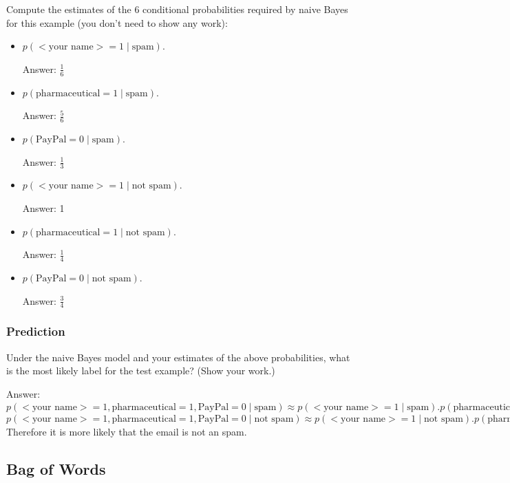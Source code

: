 \documentclass{article}
\def\ans#1{\par\gre{Answer: #1}}
\def\blu#1{{\color{blu}#1}}
\def\gre#1{{\color{gre}#1}}
\def\cond{\; | \;}
\def\items#1{\begin{itemize}#1\end{itemize}}
\begin{document}
\blu{Compute the estimates of the 6 conditional probabilities required by naive Bayes for this example}  (you don't need to show any work):
\items{
\item $p(\text{$<$your name$>$} = 1  \cond \text{spam})$.
	\ans{$\frac{1}{6}$}
\item $p(\text{pharmaceutical} = 1 \cond \text{spam})$.
	\ans{$\frac{5}{6}$}
\item $p(\text{PayPal} = 0  \cond \text{spam})$.
	\ans{$\frac{1}{3}$}
\item $p(\text{$<$your name$>$} = 1  \cond \text{not spam})$.
	\ans{1}
\item $p(\text{pharmaceutical} = 1  \cond \text{not spam})$.
	\ans{$\frac{1}{4}$}
\item $p(\text{PayPal} = 0  \cond \text{not spam})$.
	\ans{$\frac{3}{4}$}
}

\subsubsection{Prediction}


\blu{Under the naive Bayes model and your estimates of the above probabilities, what is the most likely label for the test example? (Show your work.)}

\ans{
    \newline
    $p(\text{$<$your name$>$} = 1, \text{pharmaceutical} = 1, \text{PayPal} = 0  \cond \text{spam}) \approx p(\text{$<$your name$>$} = 1  \cond \text{spam}) . p(\text{pharmaceutical} = 1 \cond \text{spam}) . p(\text{PayPal} = 0  \cond \text{spam}) = \frac{5}{108}$
    \newline
    $p(\text{$<$your name$>$} = 1, \text{pharmaceutical} = 1, \text{PayPal} = 0  \cond \text{not spam}) \approx p(\text{$<$your name$>$} = 1  \cond \text{not spam}) . p(\text{pharmaceutical} = 1 \cond \text{not spam}) . p(\text{PayPal} = 0  \cond \text{not spam}) = \frac{3}{16}$
    \newline
    \newline
    Therefore it is more likely that the email is not an spam.
}

\subsection{Bag of Words}
\end{document}
